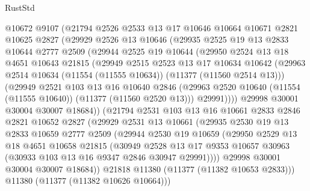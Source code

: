 \begin{lexlean}{RustStd}
\begin{coremodule}
        @10672
        @9107
        (@21794
          @2526
          @2533
          @13
          @17
          @10646
          @10664
          @10671
          @2821
          @10625
          @2827
          (@29929
            @2526
            @13
            @10646
            (@29935
              @2525
              @19
              @13
              @2833
              @10644
              @2777
              @2509
              (@29944
                @2525
                @19
                @10644
                (@29950
                  @2524
                  @13
                  @18
                  @4651
                  @10643
                  @21815
                  (@29949
                    @2515
                    @2523
                    @13
                    @17
                    @10634
                    @10642
                    (@29963 @2514 @10634 (@11554 (@11555 @10634)) (@11377 (@11560 @2514 @13)))
                    (@29949
                      @2521
                      @103
                      @13
                      @16
                      @10640
                      @2846
                      (@29963 @2520 @10640 (@11554 (@11555 @10640)) (@11377 (@11560 @2520 @13)))
                      @29991))))
              @29998
              @30001
              @30004
              @30007
              @18684))
          (@21794
            @2531
            @103
            @13
            @16
            @10661
            @2833
            @2846
            @2821
            @10652
            @2827
            (@29929
              @2531
              @13
              @10661
              (@29935
                @2530
                @19
                @13
                @2833
                @10659
                @2777
                @2509
                (@29944
                  @2530
                  @19
                  @10659
                  (@29950
                    @2529
                    @13
                    @18
                    @4651
                    @10658
                    @21815
                    (@30949
                      @2528
                      @13
                      @17
                      @9353
                      @10657
                      @30963
                      (@30933 @103 @13 @16 @9347 @2846 @30947 @29991))))
                @29998
                @30001
                @30004
                @30007
                @18684))
            @21818
            @11380
            (@11377 (@11382 @10653 @2833)))
          @11380
          (@11377 (@11382 @10626 @10664)))

\end{coremodule}
\end{lexlean}

